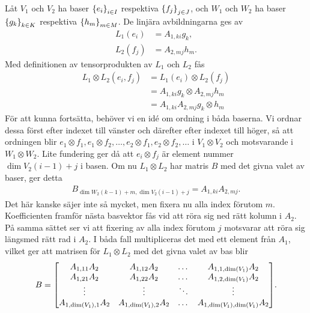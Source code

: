 \proof
Låt $V_{1}$ och $V_{2}$ ha baser $\set{e_{i}}{}_{i\in I}$ respektiva $\set{f_{j}}{}_{j\in J}$, och $W_{1}$ och $W_{2}$ ha baser $\set{g_{k}}{}_{k\in K}$ respektiva $\set{h_{m}}{}_{m\in M}$. De linjära avbildningarna ges av
\begin{align*}
	L_{1}(e_{i}) &= A_{1, ki}g_{k}, \\
	L_{2}(f_{j}) &= A_{2, mj}h_{m}.
\end{align*}
Med definitionen av tensorprodukten av $L_{1}$ och $L_{2}$ fås
\begin{align*}
	L_{1}\otimes L_{2}(e_{i}, f_{j}) &= L_{1}(e_{i})\otimes L_{2}(f_{j}) \\
	                                 &= A_{1, ki}g_{k}\otimes A_{2, mj}h_{m} \\
	                                 &= A_{1, ki}A_{2, mj}g_{k}\otimes h_{m}
\end{align*}
För att kunna fortsätta, behöver vi en idé om ordning i båda baserna. Vi ordnar dessa först efter indexet till vänster och därefter efter indexet till höger, så att ordningen blir $e_{1}\otimes f_{1}, e_{1}\otimes f_{2}, \dots, e_{2}\otimes f_{1}, e_{2}\otimes f_{2}, \dots$ i $V_{1}\otimes V_{2}$ och motsvarande i $W_{1}\otimes W_{2}$. Lite fundering ger då att $e_{i}\otimes f_{j}$ är element nummer $\dim{V_{2}}(i - 1) + j$ i basen. Om nu $L_{1}\otimes L_{2}$ har matris $B$ med det givna valet av baser, ger detta
\begin{align*}
	B_{\dim{W_{2}}(k - 1) + m, \dim{V_{2}}(i - 1) + j} = A_{1, ki}A_{2, mj}.
\end{align*}
Det här kanske säjer inte så mycket, men fixera nu alla index förutom $m$. Koefficienten framför nästa basvektor fås vid att röra sig ned rätt kolumn i $A_{2}$. På samma sättet ser vi att fixering av alla index förutom $j$ motsvarar att röra sig längsmed rätt rad i $A_{2}$. I båda fall multipliceras det med ett element från $A_{1}$, vilket ger att matrisen för $L_{1}\otimes L_{2}$ med det givna valet av bas blir
\begin{align*}
	B =
	\mqty[
		A_{1, 11}A_{2}             & A_{1, 12}A_{2}             & \dots  & A_{1, 1, \dim{V_{1}}}A_{2} \\
		A_{1, 21}A_{2}             & A_{1, 22}A_{2}             & \dots  & A_{1, 2, \dim{V_{1}}}A_{2} \\
		\vdots                     & \vdots                     & \ddots & \vdots \\
		A_{1, \dim{V_{1}}, 1}A_{2} & A_{1, \dim{V_{1}}, 2}A_{2} & \dots  & A_{1, \dim{V_{1}}, \dim{V_{1}}}A_{2}
	].
\end{align*}

